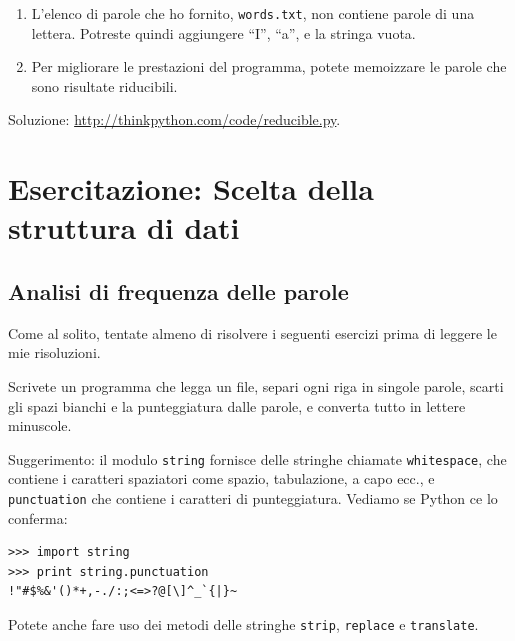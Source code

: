 \documentclass[10pt]{book}
\begin{document}
\begin{exercise}
\begin{enumerate}
\item L'elenco di parole che ho fornito, {\tt words.txt}, non contiene parole di una lettera. Potreste quindi aggiungere ``I'', ``a'', e la stringa vuota.

\item Per migliorare le prestazioni del programma, potete memoizzare le parole che sono risultate riducibili.

\end{enumerate}

Soluzione: \url{http://thinkpython.com/code/reducible.py}.

\end{exercise}








\chapter{Esercitazione: Scelta della struttura di dati}

\section{Analisi di frequenza delle parole}
\label{analysis}

Come al solito, tentate almeno di risolvere i seguenti esercizi prima di leggere le mie risoluzioni.

\vspace{0.2in}
\begin{exercise}

Scrivete un programma che legga un file, separi ogni riga in singole parole, scarti gli spazi bianchi e la punteggiatura dalle parole, e converta tutto in lettere minuscole.

Suggerimento: il modulo {\tt string} fornisce delle stringhe chiamate {\tt whitespace}, che contiene i caratteri spaziatori come spazio, tabulazione, a capo ecc., e {\tt punctuation} che contiene i caratteri di punteggiatura. Vediamo se Python ce lo conferma:

\begin{verbatim}
>>> import string
>>> print string.punctuation
!"#$%&'()*+,-./:;<=>?@[\]^_`{|}~
\end{verbatim}
%
Potete anche fare uso dei metodi delle stringhe {\tt strip},
{\tt replace} e {\tt translate}.

\end{exercise}
\end{document}
